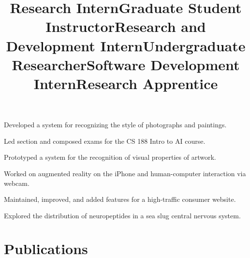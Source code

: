 \documentclass[line, margin]{res}
\begin{document}
\begin{resume}
\title{\bf Research Intern}
\begin{position}
Developed a system for recognizing the style of photographs and paintings.
\end{position}

\title{\bf Graduate Student Instructor}
\begin{position}
Led section and composed exams for the CS 188 Intro to AI course.
\end{position}

\title{\bf Research and Development Intern}
\begin{position}
Prototyped a system for the recognition of visual properties of artwork.
\end{position}

\title{\bf Undergraduate Researcher}
\begin{position}
Worked on augmented reality on the iPhone and human-computer interaction via webcam.
\end{position}

\title{\bf Software Development Intern}
\begin{position}
Maintained, improved, and added features for a high-traffic consumer website.
\end{position}


\title{\bf Research Apprentice}
\begin{position}
Explored the distribution of neuropeptides in a sea slug central nervous system.
\end{position}

\newpage

\section{\sc Publications}


\end{resume}
\end{document}
